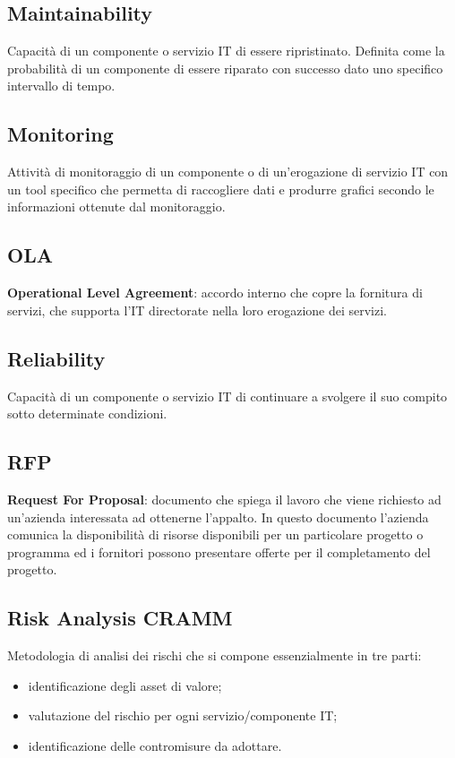 \subsection*{Maintainability}

Capacità di un componente o servizio IT di essere ripristinato.
Definita come la probabilità di un componente di essere riparato con successo dato uno specifico intervallo di tempo.

\subsection*{Monitoring}
Attività di monitoraggio di un componente o di un'erogazione di servizio IT con un tool specifico che permetta di raccogliere dati e produrre grafici secondo le informazioni ottenute dal monitoraggio.

\subsection*{OLA}

\textbf{Operational Level Agreement}: accordo interno che copre la fornitura di servizi, che supporta l’IT directorate nella loro erogazione dei servizi.


\subsection*{Reliability}
Capacità di un componente o servizio IT di continuare a svolgere il suo compito sotto determinate condizioni.


\subsection*{RFP}
\textbf{Request For Proposal}: documento che spiega il lavoro che viene richiesto ad un'azienda interessata ad ottenerne l'appalto. In questo documento l’azienda comunica la disponibilità di risorse disponibili per un particolare progetto o programma ed i fornitori possono presentare offerte per il completamento del progetto.

\subsection*{Risk Analysis CRAMM}
Metodologia di analisi dei rischi che si compone essenzialmente in tre parti:
\begin{itemize}
    \item identificazione degli asset di valore;
    \item valutazione del rischio per ogni servizio/componente IT;
    \item identificazione delle contromisure da adottare.
\end{itemize}

